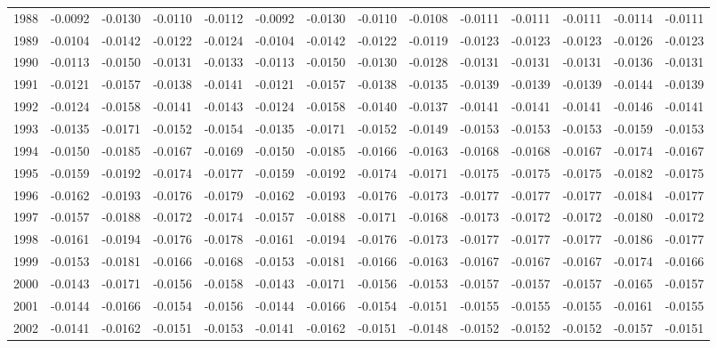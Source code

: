 \begin{tabular}{cccccccccccccc}
  1988 & -0.0092 & -0.0130 & -0.0110 & -0.0112 & -0.0092 & -0.0130 & -0.0110 & -0.0108 & -0.0111 & -0.0111 & -0.0111 & -0.0114 & -0.0111 \\ 
  1989 & -0.0104 & -0.0142 & -0.0122 & -0.0124 & -0.0104 & -0.0142 & -0.0122 & -0.0119 & -0.0123 & -0.0123 & -0.0123 & -0.0126 & -0.0123 \\ 
  1990 & -0.0113 & -0.0150 & -0.0131 & -0.0133 & -0.0113 & -0.0150 & -0.0130 & -0.0128 & -0.0131 & -0.0131 & -0.0131 & -0.0136 & -0.0131 \\ 
  1991 & -0.0121 & -0.0157 & -0.0138 & -0.0141 & -0.0121 & -0.0157 & -0.0138 & -0.0135 & -0.0139 & -0.0139 & -0.0139 & -0.0144 & -0.0139 \\ 
  1992 & -0.0124 & -0.0158 & -0.0141 & -0.0143 & -0.0124 & -0.0158 & -0.0140 & -0.0137 & -0.0141 & -0.0141 & -0.0141 & -0.0146 & -0.0141 \\ 
  1993 & -0.0135 & -0.0171 & -0.0152 & -0.0154 & -0.0135 & -0.0171 & -0.0152 & -0.0149 & -0.0153 & -0.0153 & -0.0153 & -0.0159 & -0.0153 \\ 
  1994 & -0.0150 & -0.0185 & -0.0167 & -0.0169 & -0.0150 & -0.0185 & -0.0166 & -0.0163 & -0.0168 & -0.0168 & -0.0167 & -0.0174 & -0.0167 \\ 
  1995 & -0.0159 & -0.0192 & -0.0174 & -0.0177 & -0.0159 & -0.0192 & -0.0174 & -0.0171 & -0.0175 & -0.0175 & -0.0175 & -0.0182 & -0.0175 \\ 
  1996 & -0.0162 & -0.0193 & -0.0176 & -0.0179 & -0.0162 & -0.0193 & -0.0176 & -0.0173 & -0.0177 & -0.0177 & -0.0177 & -0.0184 & -0.0177 \\ 
  1997 & -0.0157 & -0.0188 & -0.0172 & -0.0174 & -0.0157 & -0.0188 & -0.0171 & -0.0168 & -0.0173 & -0.0172 & -0.0172 & -0.0180 & -0.0172 \\ 
  1998 & -0.0161 & -0.0194 & -0.0176 & -0.0178 & -0.0161 & -0.0194 & -0.0176 & -0.0173 & -0.0177 & -0.0177 & -0.0177 & -0.0186 & -0.0177 \\ 
  1999 & -0.0153 & -0.0181 & -0.0166 & -0.0168 & -0.0153 & -0.0181 & -0.0166 & -0.0163 & -0.0167 & -0.0167 & -0.0167 & -0.0174 & -0.0166 \\ 
  2000 & -0.0143 & -0.0171 & -0.0156 & -0.0158 & -0.0143 & -0.0171 & -0.0156 & -0.0153 & -0.0157 & -0.0157 & -0.0157 & -0.0165 & -0.0157 \\ 
  2001 & -0.0144 & -0.0166 & -0.0154 & -0.0156 & -0.0144 & -0.0166 & -0.0154 & -0.0151 & -0.0155 & -0.0155 & -0.0155 & -0.0161 & -0.0155 \\ 
  2002 & -0.0141 & -0.0162 & -0.0151 & -0.0153 & -0.0141 & -0.0162 & -0.0151 & -0.0148 & -0.0152 & -0.0152 & -0.0152 & -0.0157 & -0.0151 \\ 

\end{tabular}
